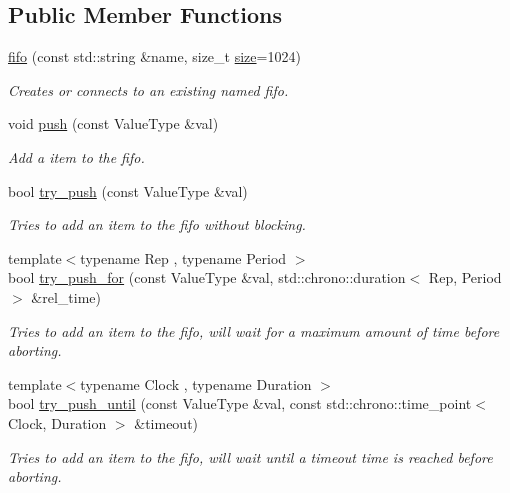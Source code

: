 \subsection*{Public Member Functions}
\begin{DoxyCompactItemize}
\item 
\hyperlink{classcpen333_1_1process_1_1fifo_abbac3b7b35974927626c0fc96540a5c9}{fifo} (const std\+::string \&name, size\+\_\+t \hyperlink{classcpen333_1_1process_1_1fifo_aeaf7bd6333245fad222fcf088e589ad6}{size}=1024)
\begin{DoxyCompactList}\small\item\em Creates or connects to an existing named fifo. \end{DoxyCompactList}\item 
void \hyperlink{classcpen333_1_1process_1_1fifo_a169331a45d9b30c6303ab8300b7901e8}{push} (const Value\+Type \&val)
\begin{DoxyCompactList}\small\item\em Add a item to the fifo. \end{DoxyCompactList}\item 
bool \hyperlink{classcpen333_1_1process_1_1fifo_ad6a7fb652df17c022023fcc805ba61eb}{try\+\_\+push} (const Value\+Type \&val)
\begin{DoxyCompactList}\small\item\em Tries to add an item to the fifo without blocking. \end{DoxyCompactList}\item 
{\footnotesize template$<$typename Rep , typename Period $>$ }\\bool \hyperlink{classcpen333_1_1process_1_1fifo_a2904c1ed9d23f0d7fd034216c5509688}{try\+\_\+push\+\_\+for} (const Value\+Type \&val, std\+::chrono\+::duration$<$ Rep, Period $>$ \&rel\+\_\+time)
\begin{DoxyCompactList}\small\item\em Tries to add an item to the fifo, will wait for a maximum amount of time before aborting. \end{DoxyCompactList}\item 
{\footnotesize template$<$typename Clock , typename Duration $>$ }\\bool \hyperlink{classcpen333_1_1process_1_1fifo_abe9fee85225689f4104f263510814db0}{try\+\_\+push\+\_\+until} (const Value\+Type \&val, const std\+::chrono\+::time\+\_\+point$<$ Clock, Duration $>$ \&timeout)
\begin{DoxyCompactList}\small\item\em Tries to add an item to the fifo, will wait until a timeout time is reached before aborting. \end{DoxyCompactList}\item 

\end{DoxyCompactItemize}
